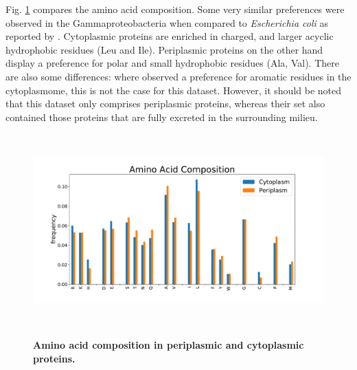 Fig. \ref{fig:amino_acid_composition} compares the amino acid composition.
Some very similar preferences were observed in the Gammaproteobacteria when compared to \textit{Escherichia coli} as reported by \cite{loos2019}.
Cytoplasmic proteins are enriched in 
charged, and larger acyclic hydrophobic residues (Leu and Ile).
Periplasmic proteins on the other hand display a preference for polar and small hydrophobic residues (Ala, Val).
There are also some differences:
where \cite{loos2019} observed a preference for aromatic residues in the cytoplasmome,
this is not the case for this dataset.
However, it should be noted that this dataset only comprises periplasmic proteins,
whereas their set also contained those proteins that are fully excreted in the surrounding milieu.


~\begin{figure}[h!]
	\centering
	\includegraphics[width=\linewidth]{./results/general_comparison/global_comparison/amino_acid_composition/img/amino_acid_composition.pdf}
	\caption{\textbf{Amino acid composition in periplasmic and cytoplasmic proteins.}}
	\label{fig:amino_acid_composition}
~\end{figure}
